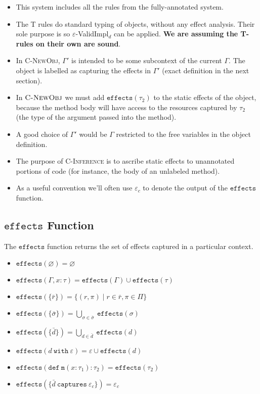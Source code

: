\documentclass{llncs}
\newcommand{\keywadj}[1]{\mathtt{#1}}
\newcommand{\keyw}[1]{\keywadj{#1}~}
\begin{document}
\begin{itemize}
	\item This system includes all the rules from the fully-annotated system.
	\item The \textsc{T} rules do standard typing of objects, without any effect analysis. Their sole purpose is so $\varepsilon$-ValidImpl$_d$ can be applied. \textbf{We are assuming the T-rules on their own are sound}.
	\item In \textsc{C-NewObj}, $\Gamma'$ is intended to be some subcontext of the current $\Gamma$. The object is labelled as capturing the effects in $\Gamma'$ (exact definition in the next section).
	\item In $\textsc{C-NewObj}$ we must add $\keywadj{effects}(\tau_2)$ to the static effects of the object, because the method body will have access to the resources captured by $\tau_2$ (the type of the argument passed into the method).
	\item A good choice of $\Gamma'$ would be $\Gamma$ restricted to the free variables in the object definition.
	\item The purpose of \textsc{C-Inference} is to ascribe static effects to unannotated portions of code (for instance, the body of an unlabeled method).
	\item As a useful convention we'll often use $\varepsilon_c$ to denote the output of the $\keywadj{effects}$ function.
\end{itemize}

\subsection{$\keywadj{effects}$ Function}

\noindent
The $\keywadj{effects}$ function returns the set of effects captured in a particular context.

\begin{itemize}
	\item $\keywadj{effects}(\varnothing) = \varnothing$
	\item $\keywadj{effects}(\Gamma, x : \tau) = \keywadj{effects}(\Gamma) \cup \keywadj{effects}(\tau)$
	\item $\keywadj{effects}(\{\bar r\}) = \{ (r, \pi) \mid r \in \bar r, \pi \in \Pi \}$
	\item $\keywadj{effects}(\{\bar \sigma\}) = \bigcup_{\sigma \in \bar \sigma}~\keywadj{effects}(\sigma)$
	\item $\keywadj{effects}(\{\bar d\}) = \bigcup_{d \in \bar d}~\keywadj{effects}(d)$
	\item $\keywadj{effects}(d~\keyw{with} \varepsilon) = \varepsilon \cup \keywadj{effects}(d)$
	\item $\keywadj{effects}(\keywadj{def~m}(x : \tau_1) : \tau_2) = \keywadj{effects}(\tau_2)$
	\item $\keywadj{effects}(\{\bar d ~\keyw{captures} \varepsilon_c\}) = \varepsilon_c$
\end{itemize}
\end{document}
